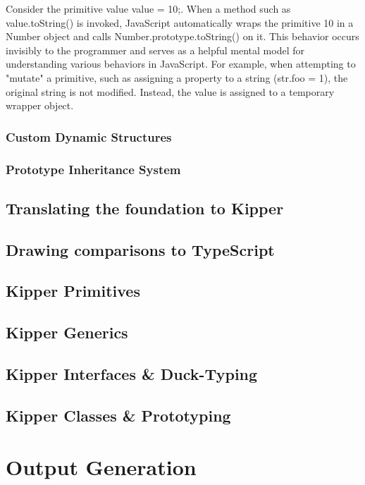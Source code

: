 Consider the primitive value value = 10;. When a method such as value.toString() is invoked, JavaScript automatically wraps the primitive 10 in a Number object and calls Number.prototype.toString() on it. This behavior occurs invisibly to the programmer and serves as a helpful mental model for understanding various behaviors in JavaScript. For example, when attempting to "mutate" a primitive, such as assigning a property to a string (str.foo = 1), the original string is not modified. Instead, the value is assigned to a temporary wrapper object.

\subsubsection{Custom Dynamic Structures}

\subsubsection{Prototype Inheritance System}

\subsection{Translating the foundation to Kipper}

\subsection{Drawing comparisons to TypeScript}

\subsection{Kipper Primitives}

\subsection{Kipper Generics}

\subsection{Kipper Interfaces \& Duck-Typing}

\subsection{Kipper Classes \& Prototyping}

\section{Output Generation}

